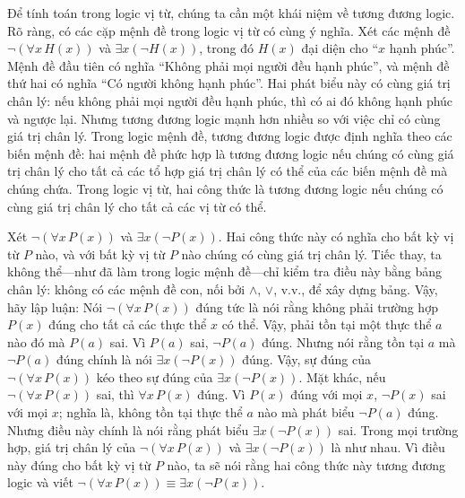 Để tính toán trong logic vị từ, chúng ta cần một khái niệm về tương đương logic. Rõ ràng, có các cặp mệnh đề trong logic vị từ có cùng ý nghĩa. Xét các mệnh đề $\neg(\forall x\, H(x))$ và $\exists x(\neg H(x))$, trong đó $H(x)$ đại diện cho ``$x$ hạnh phúc''. Mệnh đề đầu tiên có nghĩa ``Không phải mọi người đều hạnh phúc'', và mệnh đề thứ hai có nghĩa ``Có người không hạnh phúc''. Hai phát biểu này có cùng giá trị chân lý: nếu không phải mọi người đều hạnh phúc, thì có ai đó không hạnh phúc và ngược lại. Nhưng tương đương logic mạnh hơn nhiều so với việc chỉ có cùng giá trị chân lý. Trong logic mệnh đề, tương đương logic được định nghĩa theo các biến mệnh đề: hai mệnh đề phức hợp là tương đương logic nếu chúng có cùng giá trị chân lý cho tất cả các tổ hợp giá trị chân lý có thể của các biến mệnh đề mà chúng chứa. Trong logic vị từ, hai công thức là tương đương logic nếu chúng có cùng giá trị chân lý cho tất cả các vị từ có thể.

Xét $\neg(\forall x\, P(x))$ và $\exists x(\neg P(x))$. Hai công thức này có nghĩa cho bất kỳ vị từ $P$ nào, và với bất kỳ vị từ $P$ nào chúng có cùng giá trị chân lý. Tiếc thay, ta không thể---như đã làm trong logic mệnh đề---chỉ kiểm tra điều này bằng bảng chân lý: không có các mệnh đề con, nối bởi $\land$, $\lor$, v.v., để xây dựng bảng. Vậy, hãy lập luận: Nói $\neg(\forall x\, P(x))$ đúng tức là nói rằng không phải trường hợp $P(x)$ đúng cho tất cả các thực thể $x$ có thể. Vậy, phải tồn tại một thực thể $a$ nào đó mà $P(a)$ sai. Vì $P(a)$ sai, $\neg P(a)$ đúng. Nhưng nói rằng tồn tại $a$ mà $\neg P(a)$ đúng chính là nói $\exists x(\neg P(x))$ đúng. Vậy, sự đúng của $\neg(\forall x\, P(x))$ kéo theo sự đúng của $\exists x(\neg P(x))$. Mặt khác, nếu $\neg(\forall x\, P(x))$ sai, thì $\forall x\, P(x)$ đúng. Vì $P(x)$ đúng với mọi $x$, $\neg P(x)$ sai với mọi $x$; nghĩa là, không tồn tại thực thể $a$ nào mà phát biểu $\neg P(a)$ đúng. Nhưng điều này chính là nói rằng phát biểu $\exists x(\neg P(x))$ sai. Trong mọi trường hợp, giá trị chân lý của $\neg(\forall x\, P(x))$ và $\exists x(\neg P(x))$ là như nhau. Vì điều này đúng cho bất kỳ vị từ $P$ nào, ta sẽ nói rằng hai công thức này tương đương logic và viết $\neg(\forall x\, P(x)) \equiv \exists x(\neg P(x))$.


